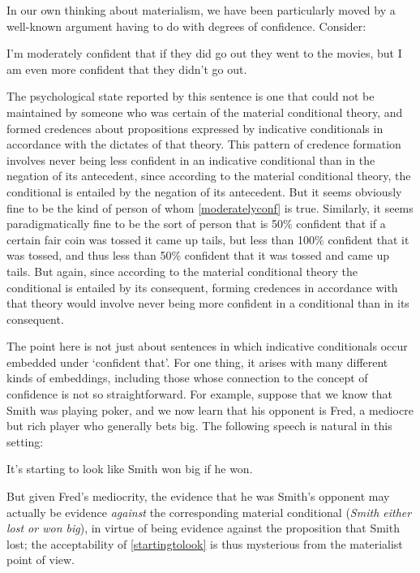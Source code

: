 \documentclass[If.tex]{subfiles}
\begin{document}
\begin{prop}
In our own thinking about materialism, we have been particularly moved by a well-known argument having to do with degrees of confidence.  Consider:
\begin{prop}
	\nitem \label{moderatelyconf}
	I'm moderately confident that if they did go out they went to the movies, but I am even more confident that they didn't go out.  
\end{prop}
The psychological state reported by this sentence is one that could not be maintained by someone who was certain of the material conditional theory, and formed credences about propositions expressed by indicative conditionals in accordance with the dictates of that theory.  This pattern of credence formation involves never being less confident in an indicative conditional than in the negation of its antecedent, since according to the material conditional theory, the conditional is entailed by the negation of its antecedent.  But it seems obviously fine to be the kind of person of whom \ref{moderatelyconf} is true.  Similarly, it seems paradigmatically fine to be the sort of person that is 50\% confident that if a certain fair coin was tossed it came up tails, but less than 100\% confident that it was tossed, and thus less than 50\% confident that it was tossed and came up tails.  But again, since according to the material conditional theory the conditional is entailed by its consequent, forming credences in accordance with that theory would involve never being more confident in a conditional than in its consequent.  

The point here is not just about sentences in which indicative conditionals occur embedded under ‘confident that’.  For one thing, it arises with many different kinds of embeddings, including those whose connection to the concept of confidence is not so straightforward.  For example, suppose that we know that Smith was playing poker, and we now learn that his opponent is Fred, a mediocre but rich player who generally bets big.  The following speech is natural in this setting:
\begin{prop}
	\nitem \label{startingtolook}
	It's starting to look like Smith won big if he won.  
\end{prop}
But given Fred's mediocrity, the evidence that he was Smith's opponent may actually be evidence \emph{against} the corresponding material conditional (\emph{Smith either lost or won big}), in virtue of being evidence against the proposition that Smith lost; the acceptability of \ref{startingtolook} is thus mysterious from the materialist point of view.  


\end{prop}
\end{document}

